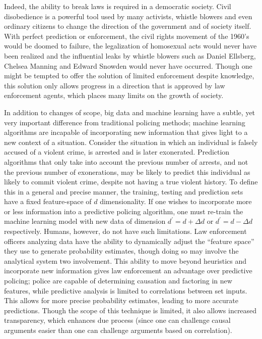 \documentclass[12pt]{article} %
\begin{document}
Indeed, the ability to break laws is required in a democratic society. \cite{rsa_conference_2016} Civil disobedience is a powerful tool used by many activists, whistle blowers and even ordinary citizens to change the direction of the government and of society itself. With perfect prediction or enforcement, the civil rights movement of the 1960's would be doomed to failure, the legalization of homosexual acts would never have been realized and the influential leaks by whistle blowers such as Daniel Ellsberg, Chelsea Manning and Edward Snowden would never have occurred. Though one might be tempted to offer the solution of limited enforcement despite knowledge, this solution only allows progress in a direction that is approved by law enforcement agents, which places many limits on the growth of society.

In addition to changes of scope, big data and machine learning have a subtle, yet very important difference from traditional policing methods; machine learning algorithms are incapable of incorporating new information that gives light to a new context of a situation. Consider the situation in which an individual is falsely accused of a violent crime, is arrested and is later exonerated. Prediction algorithms that only take into account the previous number of arrests, and not the previous number of exonerations, may be likely to predict this individual as likely to commit violent crime, despite not having a true violent history. To define this in a general and precise manner, the training, testing and prediction sets have a fixed feature-space of $d$ dimensionality. If one wishes to incorporate more or less information into a predictive policing algorithm, one must re-train the machine learning model with new data of dimension $d^\prime = d + \Delta d$ or $d^\prime = d - \Delta d$ respectively. Humans, however, do not have such limitations. Law enforcement officers analyzing data have the ability to dynamically adjust the ``feature space'' they use to generate probability estimates, though doing so may involve the analytical system two involvement. This ability to move beyond heuristics and incorporate new information gives law enforcement an advantage over predictive policing; police are capable of determining causation and factoring in new features, while predictive analysis is limited to correlations between set inputs. This allows for more precise probability estimates, leading to more accurate predictions. Though the scope of this technique is limited, it also allows increased transparency, which enhances due process (since one can challenge causal arguments easier than one can challenge arguments based on correlation). 
\end{document}
